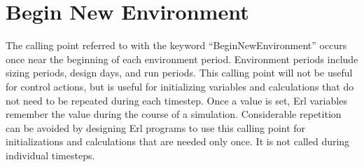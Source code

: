 \section{Begin New Environment}\label{begin-new-environment}

The calling point referred to with the keyword ``BeginNewEnvironment'' occurs once near the beginning of each environment period. Environment periods include sizing periods, design days, and run periods. This calling point will not be useful for control actions, but is useful for initializing variables and calculations that do not need to be repeated during each timestep. Once a value is set, Erl variables remember the value during the course of a simulation. Considerable repetition can be avoided by designing Erl programs to use this calling point for initializations and calculations that are needed only once. It is not called during individual timesteps.
